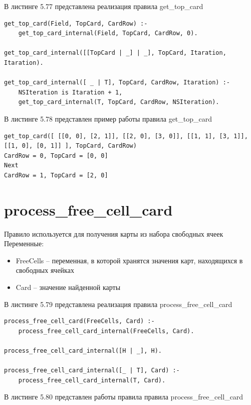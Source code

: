 \documentclass[12pt]{report}
\begin{document}
В листинге 5.77 представлена реализация правила get\_top\_card

\begin{lstlisting}[label=some-code, caption=реализация правила get\_top\_card] 
get_top_card(Field, TopCard, CardRow) :-
	get_top_card_internal(Field, TopCard, CardRow, 0).

get_top_card_internal([[TopCard | _] | _], TopCard, Itaration, Itaration).

get_top_card_internal([ _ | T], TopCard, CardRow, Itaration) :-
	NSIteration is Itaration + 1,
	get_top_card_internal(T, TopCard, CardRow, NSIteration).

\end{lstlisting}

В листинге 5.78 представлен пример работы правила get\_top\_card

\begin{lstlisting}[label=some-code, caption=пример работы правила get\_top\_card] 
get_top_card([ [[0, 0], [2, 1]], [[2, 0], [3, 0]], [[1, 1], [3, 1]], [[1, 0], [0, 1]] ], TopCard, CardRow)
CardRow = 0, TopCard = [0, 0]
Next
CardRow = 1, TopCard = [2, 0]

\end{lstlisting}
\section{process\_free\_cell\_card}
Правило используется для получения карты из набора свободных ячеек
Переменные:
\begin{itemize}
\item FreeCells – переменная, в которой хранятся значения карт, находящихся в свободных ячейках
\item Card – значение найденной карты
\end{itemize}

В листинге 5.79 представлена реализация правила process\_free\_cell\_card

\begin{lstlisting}[label=some-code, caption=реализация правила process\_free\_cell\_card] 
process_free_cell_card(FreeCells, Card) :-
	process_free_cell_card_internal(FreeCells, Card).

process_free_cell_card_internal([H | _], H).

process_free_cell_card_internal([_ | T], Card) :-
	process_free_cell_card_internal(T, Card).
\end{lstlisting}
В листинге 5.80 представлен работы правила правила process\_free\_cell\_card
\end{document}
